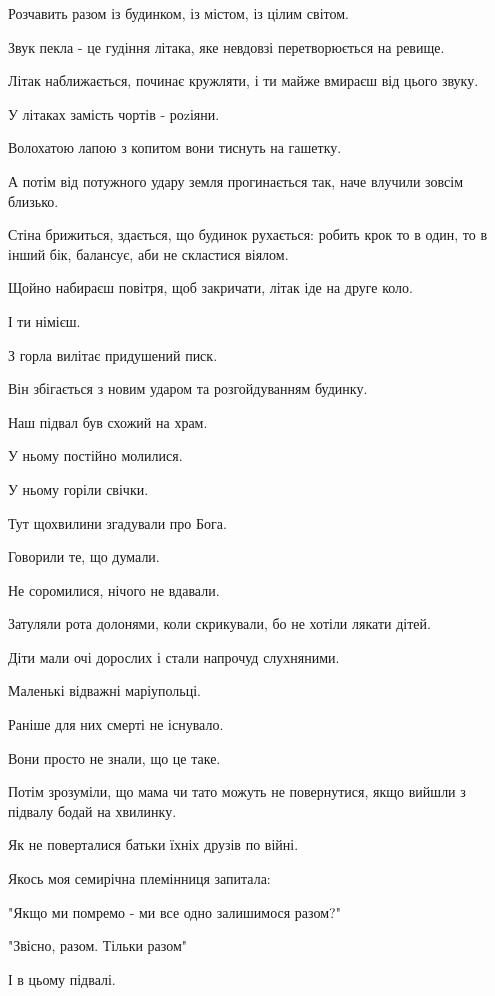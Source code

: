 Розчавить разом із будинком, із містом, із цілим світом.

Звук пекла - це гудіння літака, яке невдовзі перетворюється на ревище. 

Літак наближається, починає кружляти, і ти майже вмираєш від цього звуку. 

У літаках  замість чортів - роzіяни. 

Волохатою лапою з копитом вони тиснуть на гашетку. 

А потім від потужного удару земля прогинається так, наче влучили зовсім
близько. 

Стіна брижиться, здається, що будинок рухається: робить крок то в один, то в
інший бік, балансує, аби не скластися віялом. 

Щойно набираєш повітря, щоб закричати, літак іде на друге коло.

І ти німієш. 

З горла вилітає придушений писк.

Він збігається з новим ударом та розгойдуванням будинку.

Наш підвал був схожий на храм.

У ньому постійно молилися.

У ньому горіли свічки. 

Тут щохвилини згадували про Бога. 

Говорили те, що думали.

Не соромилися, нічого не вдавали. 

Затуляли рота долонями, коли скрикували, бо не хотіли лякати дітей.

Діти мали очі дорослих і стали напрочуд слухняними.

Маленькі відважні маріупольці.

Раніше для них смерті не існувало. 

Вони просто не знали, що це таке.

Потім зрозуміли, що мама чи тато можуть не повернутися, якщо вийшли з підвалу бодай на хвилинку. 

Як не поверталися батьки їхніх друзів по війні. 

Якось моя семирічна племінниця запитала:

"Якщо ми помремо - ми все одно залишимося разом?"

"Звісно, разом. Тільки разом"

І в цьому підвалі.
